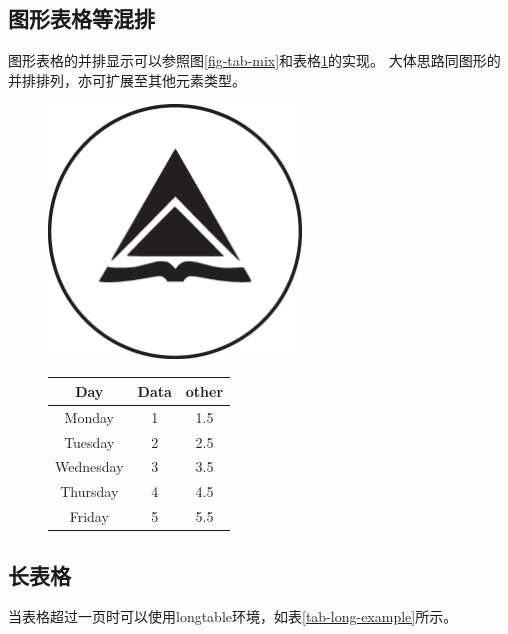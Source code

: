 \subsection{图形表格等混排}
\label{subsec-morefigtab}
图形表格的并排显示可以参照图\ref{fig-tab-mix}和表格\ref{tab-fig-mix}的实现。
大体思路同图形的并排排列，亦可扩展至其他元素类型。
\begin{figure}[h!]
    \begin{minipage}{0.5\textwidth}
        \centering
        \includegraphics[width=0.6\textwidth]{preset/figure/logo.eps}
        \label{fig-tab-mix}
    \end{minipage}
    \begin{minipage}{0.5\textwidth}
        \centering
        \begin{tabular}{c||c|c} \hline
            Day       & Data & other \\ \hline \hline
            Monday    & 1    & 1.5   \\
            Tuesday   & 2    & 2.5   \\
            Wednesday & 3    & 3.5   \\
            Thursday  & 4    & 4.5   \\
            Friday    & 5    & 5.5   \\ \hline
        \end{tabular}
        \label{tab-fig-mix}
    \end{minipage}
\end{figure}

\subsection{长表格}
\label{subsec-longtab}
当表格超过一页时可以使用longtable环境，如表\ref{tab-long-example}所示。


